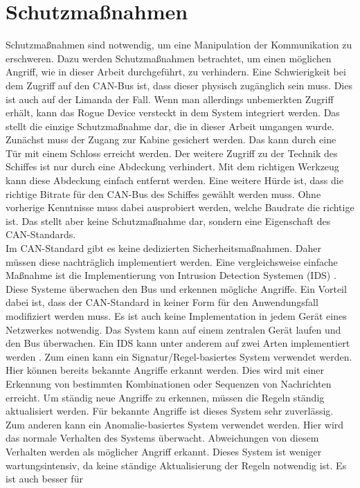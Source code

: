 \section{Schutzmaßnahmen} \label{sec:schutzmassnahmen}
Schutzmaßnahmen sind notwendig, um eine Manipulation der Kommunikation zu erschweren. Dazu werden Schutzmaßnahmen betrachtet,
um einen möglichen Angriff, wie in dieser Arbeit durchgeführt, zu verhindern.
Eine Schwierigkeit bei dem Zugriff auf den CAN-Bus ist, dass dieser physisch zugänglich sein muss. Dies ist auch auf der Limanda
der Fall. Wenn man allerdings unbemerkten Zugriff erhält, kann das Rogue Device versteckt in dem System integriert werden. 
Das stellt die einzige Schutzmaßnahme dar, die in dieser Arbeit umgangen wurde. Zunächst muss der Zugang zur Kabine 
gesichert werden. Das kann durch eine Tür mit einem Schloss erreicht werden.
Der weitere Zugriff zu der Technik des Schiffes ist nur durch eine Abdeckung
verhindert. Mit dem richtigen Werkzeug kann diese Abdeckung einfach entfernt werden.
Eine weitere Hürde ist, dass die richtige Bitrate für den CAN-Bus des Schiffes gewählt werden muss. Ohne vorherige Kenntnisse
muss dabei ausprobiert werden, welche Baudrate die richtige ist. Das stellt aber keine Schutzmaßnahme dar, sondern
eine Eigenschaft des CAN-Standards.\\
Im CAN-Standard gibt es keine dedizierten Sicherheitsmaßnahmen. Daher müssen diese nachträglich implementiert werden.
Eine vergleichsweise einfache Maßnahme ist die Implementierung von Intrusion Detection Systemen (IDS) \cite{Gmiden2016}. 
Diese Systeme überwachen
den Bus und erkennen mögliche Angriffe. Ein Vorteil dabei ist, dass der CAN-Standard in keiner Form für den 
Anwendungsfall modifiziert werden muss. Es ist auch keine Implementation in jedem Gerät eines Netzwerkes notwendig.
Das System kann auf einem zentralen Gerät laufen und den Bus überwachen.  
Ein IDS kann unter anderem auf zwei Arten implementiert werden \cite{Hoppe2009}. Zum einen kann ein Signatur/Regel-basiertes System verwendet werden.
Hier können bereits bekannte Angriffe erkannt werden. Dies wird mit einer Erkennung von bestimmten Kombinationen oder Sequenzen
von Nachrichten erreicht. Um ständig neue Angriffe zu erkennen, müssen die Regeln ständig aktualisiert werden.
Für bekannte Angriffe ist dieses System sehr zuverlässig. Zum anderen kann ein Anomalie-basiertes System verwendet werden.
Hier wird das normale Verhalten des Systems überwacht. Abweichungen von diesem Verhalten werden als möglicher Angriff erkannt.
Dieses System ist weniger wartungsintensiv, da keine ständige Aktualisierung der Regeln notwendig ist. Es ist auch besser für
